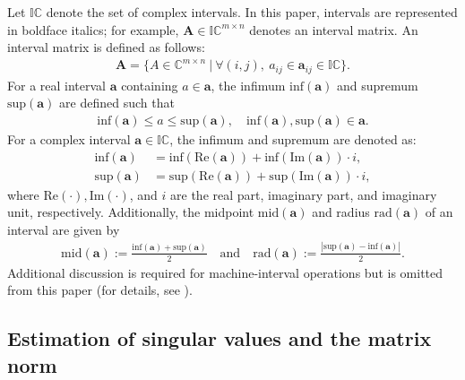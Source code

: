 Let $\mathbb{IC}$ denote the set of complex intervals. In this paper, intervals are represented in boldface italics; for example, $\bm{A} \in \mathbb{IC}^{m \times n}$ denotes an interval matrix. An interval matrix is defined as follows:
\begin{align}
    \bm{A}=\{A\in\mathbb{C}^{m\times n}\ |\ \forall (i, j),\  a_{ij}\in\bm{a}_{ij}\in\mathbb{IC}\}.
\end{align}
For a real interval $\bm{a}$ containing $a\in\bm a$, the infimum $\mathrm{inf}(\bm{a})$ and supremum $\mathrm{sup}(\bm{a})$ are defined such that
\begin{align}
    \mathrm{inf}(\bm{a})\leq  a\leq\mathrm{sup}(\bm{a}),\quad \mathrm{inf}(\bm{a}), \mathrm{sup}(\bm{a})\in \bm{a}.
\end{align}
For a complex interval $\bm{a} \in \mathbb{IC}$, the infimum and supremum are denoted as:
\begin{align}
    \mathrm{inf}(\bm{a})&=\mathrm{inf}(\mathrm{Re}(\bm{a}))+\mathrm{inf}(\mathrm{Im}(\bm{a}))\cdot i,\\ 
    \mathrm{sup}(\bm{a})&=\mathrm{sup}(\mathrm{Re}(\bm{a}))+\mathrm{sup}(\mathrm{Im}(\bm{a}))\cdot i,
\end{align}
where $\mathrm{Re}(\cdot), \mathrm{Im}(\cdot)$, and $i$ are the real part, imaginary part, and imaginary unit, respectively.
Additionally, the midpoint $\mathrm{mid}(\bm{a})$ and radius $\mathrm{rad}(\bm{a})$ of an interval are given by
\begin{align}
    \mathrm{mid}(\bm{a}):=\frac{\mathrm{inf}(\bm{a})+\mathrm{sup}(\bm{a})}{2}\quad\text{and}\quad \mathrm{rad}(\bm{a}):=\frac{|\mathrm{sup}(\bm{a})-\mathrm{inf}(\bm{a})|}{2}.
\end{align}
Additional discussion is required for machine-interval operations but is omitted from this paper (for details, see \cite{moore2009introduction}).

\subsection{Estimation of singular values and the matrix norm}

